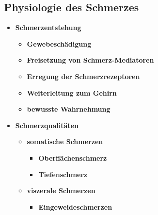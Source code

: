 \subsection{Physiologie des Schmerzes}
	\begin{itemize}
		\item \textbf{Schmerzentstehung}
			\begin{itemize}
				\item \textbf{Gewebeschädigung}
				\item \textbf{Freisetzung von Schmerz-Mediatoren}
				\item \textbf{Erregung der Schmerzrezeptoren}
				\item \textbf{Weiterleitung zum Gehirn}
				\item \textbf{bewusste Wahrnehmung}
			\end{itemize}
		\item \textbf{Schmerzqualitäten}
			\begin{itemize}
				\item \textbf{somatische Schmerzen}
					\begin{itemize}
						\item \textbf{Oberflächenschmerz}
						\item \textbf{Tiefenschmerz}
					\end{itemize}
				\item \textbf{viszerale Schmerzen}
					\begin{itemize}
						\item \textbf{Eingeweideschmerzen}
					\end{itemize}
			\end{itemize}
	\end{itemize}
						
